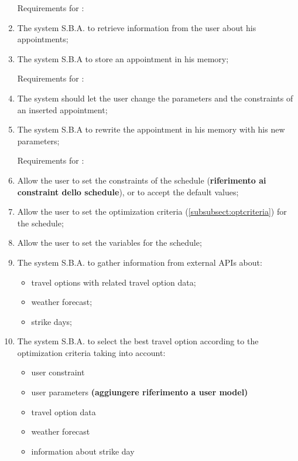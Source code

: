 \begin{enumerate}

\renewcommand\labelenumi{\textbf{R\theenumi}}

Requirements for :

\item The system S.B.A. to retrieve information from the user about his appointments; \label{req:R1}

\item The system S.B.A to store an appointment in his memory;


Requirements for :

\item The system should let the user change the parameters and the constraints of an inserted appointment; 

\item The system S.B.A to rewrite the appointment in his memory with his new parameters;

Requirements for :


\item Allow the user to set the constraints of the schedule (\textbf{riferimento ai constraint dello schedule}), or to accept the default values;
 
\item Allow the user to set the optimization criteria (\ref{subsubsect:optcriteria}) for the schedule;

\item Allow the user to set the variables for the schedule;

\item The system S.B.A. to gather information from external APIs about: 
\begin{itemize}
\item travel options with related travel option data; 
\item weather forecast;
\item strike days;
\end{itemize}

\item The system S.B.A. to select the best travel option according to the optimization criteria taking into account:
\begin{itemize}
\item user constraint
\item user parameters \textbf{(aggiungere riferimento a user model)}
\item travel option data 
\item weather forecast
\item information about strike day
\end{itemize}


\end{enumerate}
